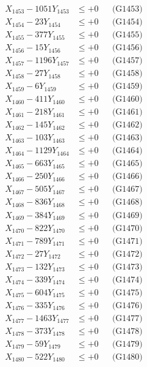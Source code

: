 \documentclass[a4paper,10pt]{article}
\begin{document}
{\begin{align}
X_{1453} - 1051Y_{1453} &\leq +0 && \text{(G1453)} \\
X_{1454} - 23Y_{1454} &\leq +0 && \text{(G1454)} \\
X_{1455} - 377Y_{1455} &\leq +0 && \text{(G1455)} \\
X_{1456} - 15Y_{1456} &\leq +0 && \text{(G1456)} \\
X_{1457} - 1196Y_{1457} &\leq +0 && \text{(G1457)} \\
X_{1458} - 27Y_{1458} &\leq +0 && \text{(G1458)} \\
X_{1459} - 6Y_{1459} &\leq +0 && \text{(G1459)} \\
X_{1460} - 411Y_{1460} &\leq +0 && \text{(G1460)} \\
\allowbreak
X_{1461} - 218Y_{1461} &\leq +0 && \text{(G1461)} \\
X_{1462} - 145Y_{1462} &\leq +0 && \text{(G1462)} \\
X_{1463} - 103Y_{1463} &\leq +0 && \text{(G1463)} \\
X_{1464} - 1129Y_{1464} &\leq +0 && \text{(G1464)} \\
X_{1465} - 663Y_{1465} &\leq +0 && \text{(G1465)} \\
X_{1466} - 250Y_{1466} &\leq +0 && \text{(G1466)} \\
X_{1467} - 505Y_{1467} &\leq +0 && \text{(G1467)} \\
X_{1468} - 836Y_{1468} &\leq +0 && \text{(G1468)} \\
X_{1469} - 384Y_{1469} &\leq +0 && \text{(G1469)} \\
X_{1470} - 822Y_{1470} &\leq +0 && \text{(G1470)} \\
\allowbreak
X_{1471} - 789Y_{1471} &\leq +0 && \text{(G1471)} \\
X_{1472} - 27Y_{1472} &\leq +0 && \text{(G1472)} \\
X_{1473} - 132Y_{1473} &\leq +0 && \text{(G1473)} \\
X_{1474} - 339Y_{1474} &\leq +0 && \text{(G1474)} \\
X_{1475} - 604Y_{1475} &\leq +0 && \text{(G1475)} \\
X_{1476} - 335Y_{1476} &\leq +0 && \text{(G1476)} \\
X_{1477} - 1463Y_{1477} &\leq +0 && \text{(G1477)} \\
X_{1478} - 373Y_{1478} &\leq +0 && \text{(G1478)} \\
X_{1479} - 59Y_{1479} &\leq +0 && \text{(G1479)} \\
X_{1480} - 522Y_{1480} &\leq +0 && \text{(G1480)} \\

\end{align}}
\end{document}
